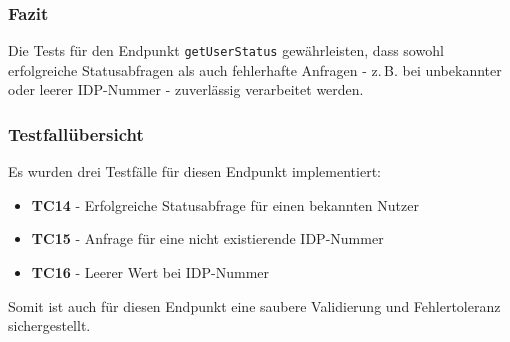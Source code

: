 \subsubsection*{Fazit}

Die Tests für den Endpunkt \texttt{getUserStatus} gewährleisten, dass sowohl erfolgreiche Statusabfragen als auch fehlerhafte Anfragen - z.\,B. bei unbekannter oder leerer IDP-Nummer - zuverlässig verarbeitet werden.

\subsubsection*{Testfallübersicht}

Es wurden drei Testfälle für diesen Endpunkt implementiert:

\begin{itemize}
  \item \textbf{TC14} - Erfolgreiche Statusabfrage für einen bekannten Nutzer
  \item \textbf{TC15} - Anfrage für eine nicht existierende IDP-Nummer
  \item \textbf{TC16} - Leerer Wert bei IDP-Nummer
\end{itemize}

Somit ist auch für diesen Endpunkt eine saubere Validierung und Fehlertoleranz sichergestellt.
